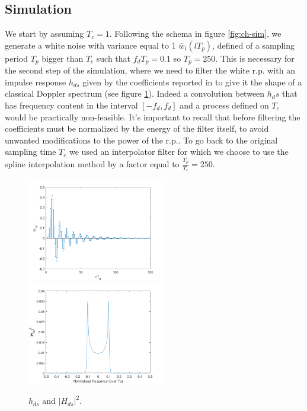 \documentclass[a4paper,11.5pt]{article}
\begin{document}
\subsection*{Simulation}


We start by assuming $T_c=1$. Following the schema in figure \ref{fig:ch-sim}, we generate a white noise with variance equal to 1 $\bar{w}_i(lT_p)$, defined of a sampling period $T_p$ bigger than $T_c$ such that $f_dT_p=0.1$ so $T_p=250$. This is necessary for the second step of the simulation, where we need to filter the white r.p. with an impulse response $h_{ds}$ given by the coefficients reported in \cite{ananas} to give it the shape of a classical Doppler spectrum (see figure \ref{fig:Ddoppler}). Indeed a convolution between $h_ds$ that has frequency content in the interval $[-f_d,f_d]$ and a process defined on $T_c$ would be practically non-feasible. It's important to recall that before filtering the coefficients must be normalized by the energy of the filter itself, to avoid unwanted modifications to the power of the r.p.. To go back to the original sampling time $T_c$ we used an interpolator filter for which we choose to use the spline interpolation method by a factor equal to $\frac{T_p}{T_c}=250$. 

\begin{figure}[ht]
	\begin{center}   
		\includegraphics[width=6cm]{figs/hds.png} 
		\includegraphics[width=6cm]{figs/dpspec.png}
		\caption{$h_{ds}$ and $|H_{ds}|^2$.}
		\label{fig:Ddoppler}
	\end{center}
\end{figure} 
\end{document}
